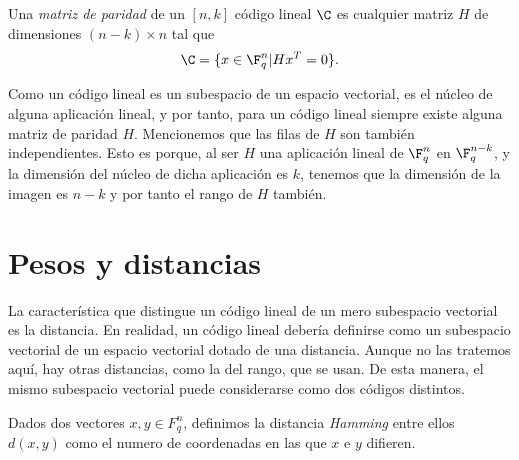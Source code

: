 \begin{definition}
    Una \textit{matriz de paridad } de un \([n,k]\) código lineal \(\C\) es cualquier matriz \(H\) de dimensiones \((n-k)\times n\) tal que
    \[
    \C = \{x \in \F_q^n | Hx^T = 0\}
    .\]
\end{definition}

Como un código lineal es un subespacio de un espacio vectorial, es el núcleo de alguna aplicación lineal, y por tanto, para un código lineal siempre existe alguna matriz de paridad \(H\). Mencionemos que las filas de \(H\) son también independientes. Esto es porque, al ser \(H\) una aplicación lineal de \(\F_q^n\) en  \(\F_q^{n-k}\), y la dimensión del núcleo de dicha aplicación es \(k\), tenemos que la dimensión de la imagen es \(n-k\) y por tanto el rango de \(H\) también.



\section{Pesos y distancias}
La característica que distingue un código lineal de un mero subespacio vectorial es la distancia. En realidad, un código lineal debería definirse como un subespacio vectorial de un espacio vectorial dotado de una distancia. Aunque no las tratemos aquí, hay otras distancias, como la del rango, que se usan. De esta manera, el mismo subespacio vectorial puede considerarse como dos códigos distintos.

\begin{definition}
Dados dos vectores \(x, y \in F_q^n\), definimos la distancia \textit{Hamming} entre ellos \(d(x,y)\) como el numero de coordenadas en las que  \(x\) e \(y\) difieren.
\end{definition}

